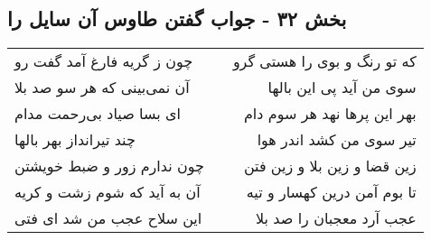 \begin{center}
\section*{بخش ۳۲ - جواب گفتن طاوس آن سایل را}
\label{sec:sh032}
\begin{longtable}{l p{0.5cm} r}
چون ز گریه فارغ آمد گفت رو
&&
که تو رنگ و بوی را هستی گرو
\\
آن نمی‌بینی که هر سو صد بلا
&&
سوی من آید پی این بالها
\\
ای بسا صیاد بی‌رحمت مدام
&&
بهر این پرها نهد هر سوم دام
\\
چند تیرانداز بهر بالها
&&
تیر سوی من کشد اندر هوا
\\
چون ندارم زور و ضبط خویشتن
&&
زین قضا و زین بلا و زین فتن
\\
آن به آید که شوم زشت و کریه
&&
تا بوم آمن درین کهسار و تیه
\\
این سلاح عجب من شد ای فتی
&&
عجب آرد معجبان را صد بلا
\\
\end{longtable}
\end{center}
